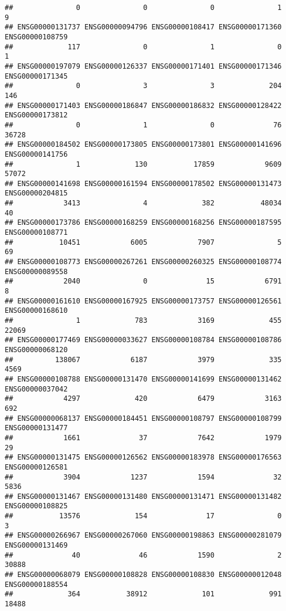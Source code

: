 \documentclass[
]{article}
\begin{document}
\begin{verbatim}
##               0               0               0               1               9 
## ENSG00000131737 ENSG00000094796 ENSG00000108417 ENSG00000171360 ENSG00000108759 
##             117               0               1               0               1 
## ENSG00000197079 ENSG00000126337 ENSG00000171401 ENSG00000171346 ENSG00000171345 
##               0               3               3             204             146 
## ENSG00000171403 ENSG00000186847 ENSG00000186832 ENSG00000128422 ENSG00000173812 
##               0               1               0              76           36728 
## ENSG00000184502 ENSG00000173805 ENSG00000173801 ENSG00000141696 ENSG00000141756 
##               1             130           17859            9609           57072 
## ENSG00000141698 ENSG00000161594 ENSG00000178502 ENSG00000131473 ENSG00000204815 
##            3413               4             382           48034              40 
## ENSG00000173786 ENSG00000168259 ENSG00000168256 ENSG00000187595 ENSG00000108771 
##           10451            6005            7907               5              69 
## ENSG00000108773 ENSG00000267261 ENSG00000260325 ENSG00000108774 ENSG00000089558 
##            2040               0              15            6791               8 
## ENSG00000161610 ENSG00000167925 ENSG00000173757 ENSG00000126561 ENSG00000168610 
##               1             783            3169             455           22069 
## ENSG00000177469 ENSG00000033627 ENSG00000108784 ENSG00000108786 ENSG00000068120 
##          138067            6187            3979             335            4569 
## ENSG00000108788 ENSG00000131470 ENSG00000141699 ENSG00000131462 ENSG00000037042 
##            4297             420            6479            3163             692 
## ENSG00000068137 ENSG00000184451 ENSG00000108797 ENSG00000108799 ENSG00000131477 
##            1661              37            7642            1979              29 
## ENSG00000131475 ENSG00000126562 ENSG00000183978 ENSG00000176563 ENSG00000126581 
##            3904            1237            1594              32            5836 
## ENSG00000131467 ENSG00000131480 ENSG00000131471 ENSG00000131482 ENSG00000108825 
##           13576             154              17               0               3 
## ENSG00000266967 ENSG00000267060 ENSG00000198863 ENSG00000281079 ENSG00000131469 
##              40              46            1590               2           30888 
## ENSG00000068079 ENSG00000108828 ENSG00000108830 ENSG00000012048 ENSG00000188554 
##             364           38912             101             991           18488 

\end{verbatim}
\end{document}

